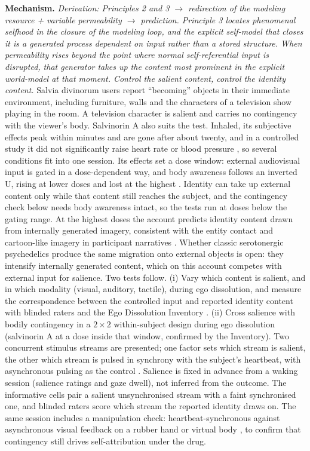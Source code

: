 \documentclass[12pt]{article}
\begin{document}
\textbf{Mechanism.} \emph{Derivation: Principles 2 and 3 $\rightarrow$ redirection of the modeling resource + variable permeability $\rightarrow$ prediction. Principle 3 locates phenomenal selfhood in the closure of the modeling loop, and the explicit self-model that closes it is a generated process dependent on input rather than a stored structure. When permeability rises beyond the point where normal self-referential input is disrupted, that generator takes up the content most prominent in the explicit world-model at that moment. Control the salient content, control the identity content.} Salvia divinorum users report ``becoming'' objects in their immediate environment, including furniture, walls and the characters of a television show playing in the room. A television character is salient and carries no contingency with the viewer's body. Salvinorin A also suits the test. Inhaled, its subjective effects peak within minutes and are gone after about twenty, and in a controlled study it did not significantly raise heart rate or blood pressure \citep{Johnson2011}, so several conditions fit into one session. Its effects set a dose window: external audiovisual input is gated in a dose-dependent way, and body awareness follows an inverted U, rising at lower doses and lost at the highest \citep{Maqueda2015}. Identity can take up external content only while that content still reaches the subject, and the contingency check below needs body awareness intact, so the tests run at doses below the gating range. At the highest doses the account predicts identity content drawn from internally generated imagery, consistent with the entity contact and cartoon-like imagery in participant narratives \citep{Johnson2011}. Whether classic serotonergic psychedelics produce the same migration onto external objects is open: they intensify internally generated content, which on this account competes with external input for salience. Two tests follow. (i) Vary which content is salient, and in which modality (visual, auditory, tactile), during ego dissolution, and measure the correspondence between the controlled input and reported identity content with blinded raters and the Ego Dissolution Inventory \citep{Nour2016}. (ii) Cross salience with bodily contingency in a $2 \times 2$ within-subject design during ego dissolution (salvinorin A at a dose inside that window, confirmed by the Inventory). Two concurrent stimulus streams are presented; one factor sets which stream is salient, the other which stream is pulsed in synchrony with the subject's heartbeat, with asynchronous pulsing as the control \citep{Suzuki2013}. Salience is fixed in advance from a waking session (salience ratings and gaze dwell), not inferred from the outcome. The informative cells pair a salient unsynchronised stream with a faint synchronised one, and blinded raters score which stream the reported identity draws on. The same session includes a manipulation check: heartbeat-synchronous against asynchronous visual feedback on a rubber hand or virtual body \citep{Suzuki2013,Aspell2013}, to confirm that contingency still drives self-attribution under the drug.
\end{document}

